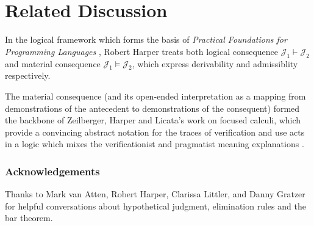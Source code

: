 \documentclass[11pt]{amsart}
\theoremstyle{definition}
\theoremstyle{remark}
\numberwithin{equation}{section}
\newcommand\JJ{\mathcal{J}}
\begin{document}
\section{Related Discussion}

In the logical framework which forms the basis of \emph{Practical Foundations
for Programming Languages} \cite{PFPL}, Robert Harper treats both logical
consequence $\JJ_1\vdash\JJ_2$ and material consequence $\JJ_1\vDash\JJ_2$,
which express derivability and admissiblity respectively.

The material consequence (and its open-ended interpretation as a mapping from
demonstrations of the antecedent to demonstrations of the consequent) formed the
backbone of Zeilberger, Harper and Licata's work on focused calculi, which
provide a convincing abstract notation for the traces of verification and use
acts in a logic which mixes the verificationist and pragmatist meaning
explanations \cite{zeilberger:thesis, licata-zeilberger-harper:focusing,
zeilberger:2008}.


\subsubsection*{Acknowledgements}

Thanks to Mark van Atten, Robert Harper, Clarissa Littler, and Danny Gratzer for
helpful conversations about hypothetical judgment, elimination rules and the bar
theorem.

\nocite{*}


\end{document}
